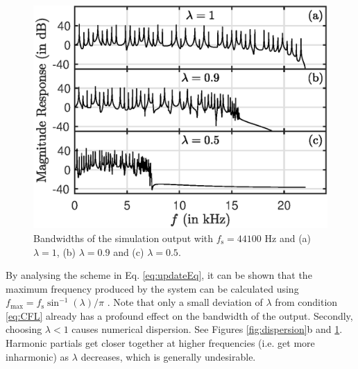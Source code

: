 \begin{figure}[t]
    \centering
    \includegraphics[width=0.9\columnwidth]{Figures/bandwidthCompact.eps}
    \caption{Bandwidths of the simulation output %
    with $f_\text{s} = 44100$ Hz and 
    (a) $\lambda = 1$, (b) $\lambda = 0.9$ and (c) $\lambda = 0.5$. 
    \label{fig:bandWidths}}
\end{figure}
%
By analysing the scheme in Eq. \eqref{eq:updateEq}, it can be shown that the maximum frequency produced by the system can be calculated using $f_\text{max} = f_\text{s} \sin^{-1}(\lambda)/\pi$ \cite[Chap. 6]{bilbao2009}.
%
Note that only a small deviation of $\lambda$ from condition \eqref{eq:CFL} already has a profound effect on the bandwidth of the output.
%
Secondly, choosing $\lambda < 1$ causes numerical dispersion. See Figures \ref{fig:dispersion}b and \ref{fig:bandWidths}. Harmonic partials get closer together at higher frequencies (i.e. get more inharmonic) as $\lambda$ decreases, which is generally undesirable.

